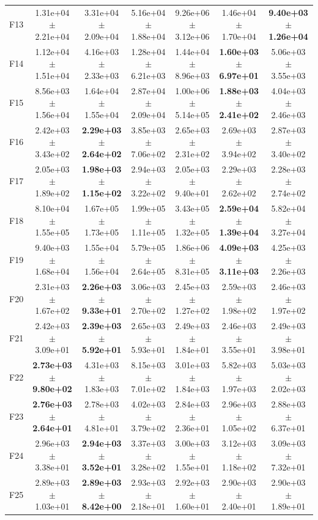 \begin{table}
{\begin{tabular}{lcccccc}
F13 & 1.31e+04 $\pm$ 2.21e+04 & 3.31e+04 $\pm$ 2.09e+04 & 5.16e+04 $\pm$ 1.88e+04 & 9.26e+06 $\pm$ 3.12e+06 & 1.46e+04 $\pm$ 1.70e+04 & \textbf{9.40e+03 $\pm$ 1.26e+04} \\
F14 & 1.12e+04 $\pm$ 1.51e+04 & 4.16e+03 $\pm$ 2.33e+03 & 1.28e+04 $\pm$ 6.21e+03 & 1.44e+04 $\pm$ 8.96e+03 & \textbf{1.60e+03 $\pm$ 6.97e+01} & 5.06e+03 $\pm$ 3.55e+03 \\
F15 & 8.56e+03 $\pm$ 1.56e+04 & 1.64e+04 $\pm$ 1.55e+04 & 2.87e+04 $\pm$ 2.09e+04 & 1.00e+06 $\pm$ 5.14e+05 & \textbf{1.88e+03 $\pm$ 2.41e+02} & 4.04e+03 $\pm$ 2.46e+03 \\
F16 & 2.42e+03 $\pm$ 3.43e+02 & \textbf{2.29e+03 $\pm$ 2.64e+02} & 3.85e+03 $\pm$ 7.06e+02 & 2.65e+03 $\pm$ 2.31e+02 & 2.69e+03 $\pm$ 3.94e+02 & 2.87e+03 $\pm$ 3.40e+02 \\
F17 & 2.05e+03 $\pm$ 1.89e+02 & \textbf{1.98e+03 $\pm$ 1.15e+02} & 2.94e+03 $\pm$ 3.22e+02 & 2.05e+03 $\pm$ 9.40e+01 & 2.29e+03 $\pm$ 2.62e+02 & 2.28e+03 $\pm$ 2.74e+02 \\
F18 & 8.10e+04 $\pm$ 1.55e+05 & 1.67e+05 $\pm$ 1.73e+05 & 1.99e+05 $\pm$ 1.11e+05 & 3.43e+05 $\pm$ 1.32e+05 & \textbf{2.59e+04 $\pm$ 1.39e+04} & 5.82e+04 $\pm$ 3.27e+04 \\
F19 & 9.40e+03 $\pm$ 1.68e+04 & 1.55e+04 $\pm$ 1.56e+04 & 5.79e+05 $\pm$ 2.64e+05 & 1.86e+06 $\pm$ 8.31e+05 & \textbf{4.09e+03 $\pm$ 3.11e+03} & 4.25e+03 $\pm$ 2.26e+03 \\
F20 & 2.31e+03 $\pm$ 1.67e+02 & \textbf{2.26e+03 $\pm$ 9.33e+01} & 3.06e+03 $\pm$ 2.70e+02 & 2.45e+03 $\pm$ 1.27e+02 & 2.59e+03 $\pm$ 1.98e+02 & 2.46e+03 $\pm$ 1.97e+02 \\
F21 & 2.42e+03 $\pm$ 3.09e+01 & \textbf{2.39e+03 $\pm$ 5.92e+01} & 2.65e+03 $\pm$ 5.93e+01 & 2.49e+03 $\pm$ 1.84e+01 & 2.46e+03 $\pm$ 3.55e+01 & 2.49e+03 $\pm$ 3.98e+01 \\
F22 & \textbf{2.73e+03 $\pm$ 9.80e+02} & 4.31e+03 $\pm$ 1.83e+03 & 8.15e+03 $\pm$ 7.01e+02 & 3.01e+03 $\pm$ 1.84e+03 & 5.82e+03 $\pm$ 1.97e+03 & 5.03e+03 $\pm$ 2.02e+03 \\
F23 & \textbf{2.76e+03 $\pm$ 2.64e+01} & 2.78e+03 $\pm$ 4.81e+01 & 4.02e+03 $\pm$ 3.79e+02 & 2.84e+03 $\pm$ 2.36e+01 & 2.96e+03 $\pm$ 1.05e+02 & 2.88e+03 $\pm$ 6.37e+01 \\
F24 & 2.96e+03 $\pm$ 3.38e+01 & \textbf{2.94e+03 $\pm$ 3.52e+01} & 3.37e+03 $\pm$ 3.28e+02 & 3.00e+03 $\pm$ 1.55e+01 & 3.12e+03 $\pm$ 1.18e+02 & 3.09e+03 $\pm$ 7.32e+01 \\
F25 & 2.89e+03 $\pm$ 1.03e+01 & \textbf{2.89e+03 $\pm$ 8.42e+00} & 2.93e+03 $\pm$ 2.18e+01 & 2.92e+03 $\pm$ 1.60e+01 & 2.90e+03 $\pm$ 2.40e+01 & 2.90e+03 $\pm$ 1.89e+01 \\

\end{tabular}}
\end{table}
